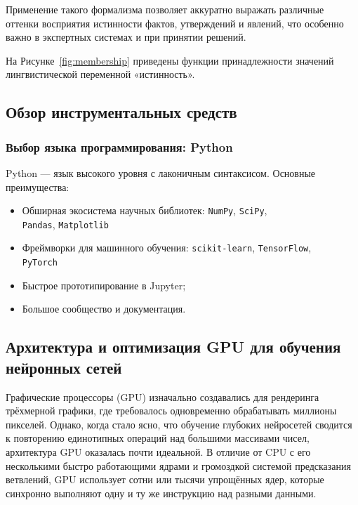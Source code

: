 Применение такого формализма позволяет аккуратно выражать различные оттенки восприятия истинности фактов, утверждений и явлений, что особенно важно в экспертных системах и при принятии решений.

На Рисунке~\ref{fig:membership} приведены функции принадлежности значений лингвистической переменной «истинность».

\subsection{Обзор инструментальных средств}
\label{sec:tools}

\subsubsection{Выбор языка программирования: Python}
\label{sec:tools_python}

Python — язык высокого уровня с лаконичным синтаксисом. Основные преимущества:
\begin{itemize}
  \item Обширная экосистема научных библиотек: \texttt{NumPy}, \texttt{SciPy}, \\ \texttt{Pandas}, \texttt{Matplotlib}
  \item Фреймворки для машинного обучения: \texttt{scikit-learn}, \texttt{TensorFlow}, \\ \texttt{PyTorch}
  \item Быстрое прототипирование в Jupyter;
  \item Большое сообщество и документация.
\end{itemize}

\subsection{Архитектура и оптимизация GPU для обучения нейронных сетей}
\label{ssec:gpu_architecture}

Графические процессоры (GPU) изначально создавались для рендеринга трёхмерной графики, где требовалось одновременно обрабатывать миллионы пикселей. Однако, когда стало ясно, что обучение глубоких нейросетей сводится к повторению единотипных операций над большими массивами чисел, архитектура GPU оказалась почти идеальной. В отличие от CPU с его несколькими быстро работающими ядрами и громоздкой системой предсказания ветвлений, GPU использует сотни или тысячи упрощённых ядер, которые синхронно выполняют одну и ту же инструкцию над разными данными.   

